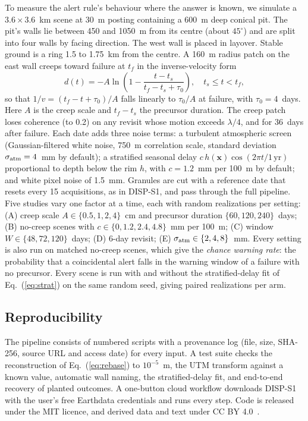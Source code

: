 \documentclass[aps,prd,twocolumn,superscriptaddress,nofootinbib,floatfix,preprintnumbers,10pt]{revtex4-2}
\begin{document}
To measure the alert rule's behaviour where the answer is known, we simulate a $3.6\times3.6$~km scene at 30~m posting containing a 600~m deep conical pit. The pit's walls lie between 450 and 1050~m from its centre (about $45^\circ$) and are split into four walls by facing direction. The west wall is placed in layover. Stable ground is a ring 1.5 to 1.75~km from the centre. A 160~m radius patch on the east wall creeps toward failure at $t_f$ in the inverse-velocity form~\cite{Fukuzono1985,Voight1988}
\begin{equation}
d(t) = -A\ln\!\left(1-\frac{t-t_s}{t_f-t_s+\tau_0}\right),\quad t_s\le t<t_f,
\label{eq:creep}
\end{equation}
so that $1/v = (t_f - t + \tau_0)/A$ falls linearly to $\tau_0/A$ at failure, with $\tau_0=4$~days. Here $A$ is the creep scale and $t_f-t_s$ the precursor duration. The creep patch loses coherence (to 0.2) on any revisit whose motion exceeds $\lambda/4$, and for 36~days after failure. Each date adds three noise terms: a turbulent atmospheric screen (Gaussian-filtered white noise, 750~m correlation scale, standard deviation $\sigma_{\rm atm}=4$~mm by default); a stratified seasonal delay $c\,h(\bm{x})\cos(2\pi t/1\,\mathrm{yr})$ proportional to depth below the rim $h$, with $c=1.2$~mm per 100~m by default; and white pixel noise of 1.5~mm. Granules are cut with a reference date that resets every 15 acquisitions, as in DISP-S1, and pass through the full pipeline. Five studies vary one factor at a time, each with \Seeds{} random realizations per setting: (A) creep scale $A\in\{0.5,1,2,4\}$~cm and precursor duration $\{60,120,240\}$~days; (B) no-creep scenes with $c\in\{0,1.2,2.4,4.8\}$~mm per 100~m; (C) window $W\in\{48,72,120\}$~days; (D) 6-day revisit; (E) $\sigma_{\rm atm}\in\{2,4,8\}$~mm. Every setting is also run on matched no-creep scenes, which give the \emph{chance warning rate}: the probability that a coincidental alert falls in the warning window of a failure with no precursor. Every scene is run with and without the stratified-delay fit of Eq.~(\ref{eq:strat}) on the same random seed, giving \NRealArm{} paired realizations per arm.

\subsection{Reproducibility}

The pipeline consists of numbered scripts with a provenance log (file, size, SHA-256, source URL and access date) for every input. A test suite checks the reconstruction of Eq.~(\ref{eq:rebase}) to $10^{-5}$~m, the UTM transform against a known value, automatic wall naming, the stratified-delay fit, and end-to-end recovery of planted outcomes. A one-button cloud workflow downloads DISP-S1 with the user's free Earthdata credentials and runs every step. Code is released under the MIT licence, and derived data and text under CC BY 4.0~\cite{Alabede2026}.
\end{document}
